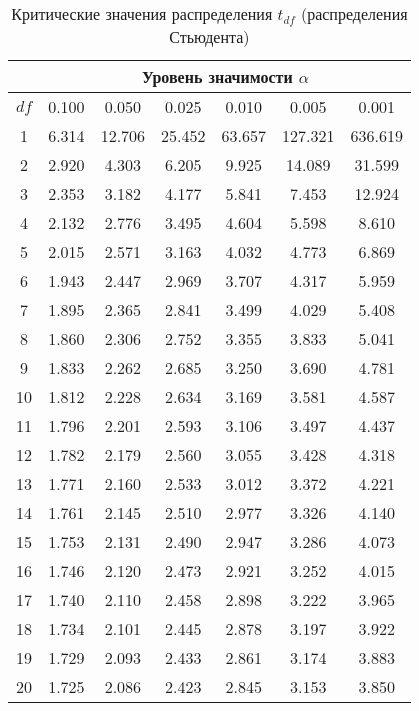 \documentclass[12pt]{article}
\begin{document}
\begin{table}
\caption{Критические значения распределения $t_{df}$ (распределения
Стьюдента)}
\begin{center}
{\footnotesize
\begin{tabular}{|c|c|c|c|c|c|c|}
	\hline
	& \multicolumn{6}{c|}{Уровень значимости $\alpha$} \\ \hline
	$df$  & 0.100 &  0.050 &  0.025 &  0.010 &  0.005 &  0.001\\ \hline
	1 &  6.314 &  12.706 & 25.452 & 63.657 & 127.321& 636.619\\
	2 &  2.920 &  4.303 &  6.205 &  9.925 &  14.089 & 31.599\\
	3 &  2.353 &  3.182 &  4.177 &  5.841 &  7.453 &  12.924\\
	4 &  2.132 &  2.776 &  3.495 &  4.604 &  5.598 &  8.610\\
	5 &  2.015 &  2.571& 3.163 &  4.032 &  4.773 &  6.869\\
	6 &  1.943 &  2.447 &  2.969 &  3.707 &  4.317&   5.959\\
	7  & 1.895 &  2.365 &  2.841 &  3.499 &  4.029 &  5.408 \\
	8  & 1.860 &  2.306&2.752 &  3.355 &  3.833 &  5.041\\
	9 &  1.833 &  2.262 &  2.685 &  3.250 &  3.690 &  4.781\\
	10 & 1.812 &  2.228 &  2.634 &  3.169 &  3.581 &  4.587 \\
	11 & 1.796 &  2.201&2.593 &  3.106 &  3.497 &  4.437\\
	12 & 1.782 &  2.179 &  2.560 &  3.055 &  3.428 &  4.318\\
	13 & 1.771 &  2.160 &  2.533 &  3.012 &  3.372 &  4.221\\
	14 & 1.761&2.145 &2.510 &  2.977 &  3.326 &  4.140\\
	15 & 1.753 &  2.131 &  2.490& 2.947&3.286 &4.073 \\
	16 & 1.746 &  2.120 &  2.473 &  2.921 &  3.252& 4.015\\
	17 &1.740&2.110 &2.458 &  2.898 &  3.222 &  3.965 \\
	18  &1.734 &2.101 &2.445 &  2.878& 3.197& 3.922 \\
	19 & 1.729 &  2.093 &  2.433& 2.861& 3.174&   3.883 \\
	20 &1.725& 2.086 &2.423 &  2.845 &  3.153 &3.850 \\

\end{tabular}}
\end{center}
\end{table}
\end{document}
